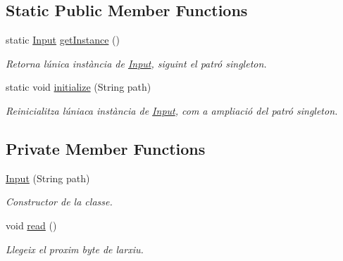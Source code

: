 \subsection*{Static Public Member Functions}
\begin{DoxyCompactItemize}
\item 
static \hyperlink{classpersistencia_1_1input_1_1Input}{Input} \hyperlink{classpersistencia_1_1input_1_1Input_aa45459b94e501548a7b223d24b560ad0}{get\+Instance} ()
\begin{DoxyCompactList}\small\item\em Retorna l\textquotesingle{}única instància de \hyperlink{classpersistencia_1_1input_1_1Input}{Input}, siguint el patró singleton. \end{DoxyCompactList}\item 
static void \hyperlink{classpersistencia_1_1input_1_1Input_abe53dec7aca98b94d0ec5e3200483513}{initialize} (String path)
\begin{DoxyCompactList}\small\item\em Reinicialitza l\textquotesingle{}úniaca instància de \hyperlink{classpersistencia_1_1input_1_1Input}{Input}, com a ampliació del patró singleton. \end{DoxyCompactList}\end{DoxyCompactItemize}
\subsection*{Private Member Functions}
\begin{DoxyCompactItemize}
\item 
\hyperlink{classpersistencia_1_1input_1_1Input_a9b30ef8d489a1fc5b4aa04a14474349a}{Input} (String path)
\begin{DoxyCompactList}\small\item\em Constructor de la classe. \end{DoxyCompactList}\item 
void \hyperlink{classpersistencia_1_1input_1_1Input_a24eae4109b4ff4954ff2d7feef2fa4e4}{read} ()
\begin{DoxyCompactList}\small\item\em Llegeix el proxim byte de l\textquotesingle{}arxiu. \end{DoxyCompactList}\end{DoxyCompactItemize}
